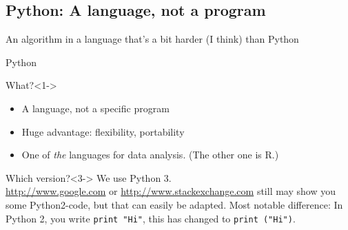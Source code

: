 \documentclass[handout]{beamer}
\begin{document}
\subsection{Python: A language, not a program}


\begin{frame}[plain]
\footnotesize{An algorithm in a language that's a bit harder (I think) than Python}
\end{frame}



\begin{frame}{Python}
\begin{block}{What?}<1->
\begin{itemize}
\item A language, not a specific program
\item Huge advantage: flexibility, portability
\item One of \emph{the} languages for data analysis. \tiny{(The other one is R.)}
\end{itemize}
\end{block}

\begin{block}{Which version?}<3->
We use Python 3. \\ 
\footnotesize{\url{http://www.google.com} or \url{http://www.stackexchange.com} still may show you some Python2-code, but that can easily be adapted. Most notable difference: In Python 2, you write {\tt print "Hi"}, this has changed to {\tt print ("Hi")}.}\\
\end{block}
\end{frame}
\end{document}
